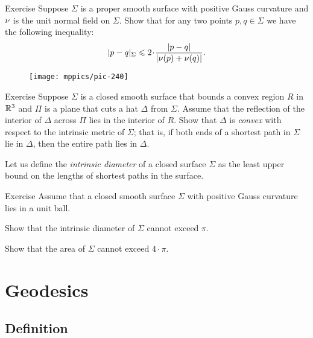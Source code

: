 \begin{thm}{Exercise}\label{ex:length-dist-conv}
Suppose $\Sigma$ is a proper smooth surface with positive Gauss curvature and $\nu$ is the unit normal field on $\Sigma$.
Show that for any two points $p,q\in \Sigma$ we have the following inequality:
\[|p-q|_\Sigma\le 2\cdot \frac{|p-q|}{|\Norm(p)+\Norm(q)|}.\]

\end{thm}


\begin{wrapfigure}{r}{27 mm}
\vskip-10mm
\centering
\texttt{[image: mppics/pic-240]}
\end{wrapfigure}

\begin{thm}{Exercise}\label{ex:hat-convex}
Suppose $\Sigma$ is a closed smooth surface that bounds a convex region $R$ 
in $\mathbb{R}^3$
and $\Pi$ is a plane that cuts a hat $\Delta$ from $\Sigma$.
Assume that the reflection of the interior of $\Delta$ across $\Pi$ lies in the interior of $R$.
Show that $\Delta$ is \emph{convex} with respect to the intrinsic metric  of $\Sigma$;
that is, 
if both ends of a shortest path in $\Sigma$ 
lie in $\Delta$,
then the entire path lies in $\Delta$.
\end{thm}


Let us define the \emph{intrinsic diameter} of a closed surface $\Sigma$ as the least upper bound on the lengths of shortest paths in the surface.

\begin{thm}{Exercise}\label{ex:intrinsic-diameter}
Assume that a closed smooth surface $\Sigma$ with positive Gauss curvature lies in a unit ball.

\begin{subthm}{} Show that the intrinsic diameter of $\Sigma$ cannot exceed $\pi$.
 
\end{subthm}

\begin{subthm}{}
Show that the area of $\Sigma$ cannot exceed $4\cdot \pi$.
\end{subthm}

\end{thm}

\chapter{Geodesics}


\section{Definition}

